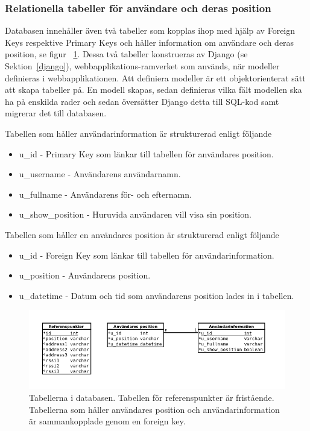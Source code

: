 \documentclass[a4paper,12pt]{article}
\begin{document}
 \subsubsection{Relationella tabeller för användare och deras position}
 Databasen innehåller även två tabeller som
 kopplas ihop med hjälp av Foreign Keys respektive Primary Keys och håller information om användare och deras position, se figur ~\ref{fig:db_tabeller}.
 Dessa två tabeller konstrueras av Django (se Sektion~\ref{django}), webbapplikations-ramverket som används, när modeller definieras i webbapplikationen. Att definiera modeller är ett objektorienterat sätt att skapa tabeller på. En modell skapas, sedan definieras vilka fält modellen ska ha på enskilda rader och sedan översätter Django detta till SQL-kod samt migrerar det till databasen.

 Tabellen som håller användarinformation är strukturerad enligt följande
 \begin{itemize}
   \item  u\_id - Primary Key som länkar till tabellen för användares position.
   \item  u\_username - Användarens användarnamn.
   \item  u\_fullname - Användarens för- och efternamn.
   \item  u\_show\_position - Huruvida användaren vill visa sin position.
 \end{itemize}

 Tabellen som håller en användares position är strukturerad enligt följande
 \begin{itemize}
   \item u\_id - Foreign Key som länkar till tabellen för användarinformation.
   \item u\_position - Användarens position.
   \item u\_datetime - Datum och tid som användarens position lades in i tabellen.
 \end{itemize}

 \begin{figure}[H]
   \includegraphics[width=15cm]{media/db_tabeller.png}
   \caption{Tabellerna i databasen. Tabellen för referenspunkter är fristående. Tabellerna som håller användares position och användarinformation är sammankopplade genom en foreign key.}
   \label{fig:db_tabeller}
 \end{figure}
\end{document}
